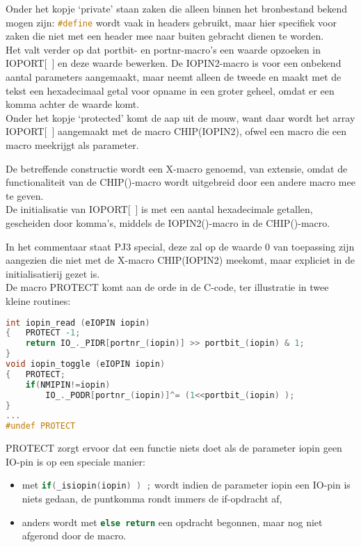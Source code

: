 \documentclass[a4paper, 11pt, fleqn, twoside]{scrartcl}%
\begin{document}
Onder het kopje `private' staan zaken die alleen binnen het bronbestand bekend
mogen zijn:
\lstinline[language=C]!#define! wordt vaak in headers gebruikt, maar hier
specifiek voor zaken die niet met een header mee naar buiten gebracht dienen
te worden.\\

Het valt verder op dat portbit- en portnr-macro's een waarde opzoeken in
IOPORT[\ ] en deze waarde bewerken. De IOPIN2-macro is voor een onbekend
aantal parameters aangemaakt, maar neemt alleen de tweede en maakt met de
tekst een hexadecimaal getal voor opname in een groter geheel, omdat er
een komma achter de waarde komt.\\

Onder het kopje `protected' komt de aap uit de mouw, want daar wordt het
array IOPORT[\ ] aangemaakt met de macro CHIP(IOPIN2), ofwel een macro die
een macro meekrijgt als parameter.

De betreffende constructie wordt een X-macro genoemd, van extensie, omdat
de functionaliteit van de CHIP()-macro wordt uitgebreid door een andere
macro mee te geven.\\

De initialisatie van IOPORT[\ ] is met een aantal hexadecimale getallen, 
gescheiden door komma's, middels de IOPIN2()-macro in de CHIP()-macro.

In het commentaar staat PJ3 special, deze zal op de waarde 0 van toepassing
zijn aangezien die niet met de X-macro CHIP(IOPIN2) meekomt, maar expliciet 
in de initialisatierij gezet is.\\[1ex]

De macro PROTECT komt aan de orde in de C-code, ter illustratie in twee kleine 
routines:
\begin{lstlisting}[language=C,backgroundcolor=\color{orange!10},framerule=0pt,columns=fixed]
int iopin_read (eIOPIN iopin)
{	PROTECT -1;
	return IO_._PIDR[portnr_(iopin)] >> portbit_(iopin) & 1;
}
void iopin_toggle (eIOPIN iopin)
{	PROTECT;
	if(NMIPIN!=iopin)
		IO_._PODR[portnr_(iopin)]^= (1<<portbit_(iopin) );
}
...
#undef PROTECT
\end{lstlisting}

PROTECT zorgt ervoor dat een functie niets doet als de parameter iopin geen
IO-pin is op een speciale manier:
\begin{itemize}
\item met \lstinline[language=C]!if(_isiopin(iopin) ) ;! wordt
 indien de parameter iopin een IO-pin is niets gedaan, de puntkomma rondt
 immers de if-opdracht af,
\item anders wordt met \lstinline[language=C]!else return! een opdracht
 begonnen, maar nog niet afgerond door de macro.
\end{itemize}
\end{document}
